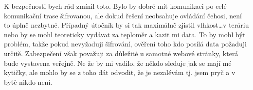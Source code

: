 K bezpečnosti bych rád zmínil toto. Bylo by dobré mít komunikaci po celé komunikační trase šifrovanou, ale dokud řešení 
neobsahuje ovládání čehosi, není to úplně nezbytné. Případný útočník by si tak maximálně zjistil vlhkost\ldots v teráriu
nebo by se mohl teoreticky vydávat za teploměr a kazit mi data. To by mohl být problém, takže pokud nevyžaduji 
šifrování, ověření toho kdo posílá data požaduji určitě. Zabezpečení však považuji za důležité u samotné webové stránky, 
která bude vystavena veřejně. Ne že by mi vadilo, že někdo sleduje jak se mají mé kytičky, ale mohlo by se z toho dát 
odvodit, že je nezalévám tj. jsem pryč a v bytě nikdo není.%

